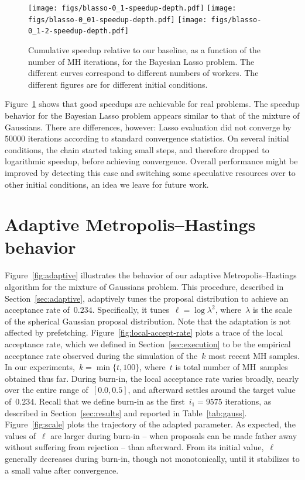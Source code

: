 \documentclass[angelino.tex]{subfiles}
\begin{document}
\begin{figure}[t!]
\centering
\vspace{-0.3in}
\texttt{[image: figs/blasso-0\_1-speedup-depth.pdf]}
\texttt{[image: figs/blasso-0\_01-speedup-depth.pdf]}
\texttt{[image: figs/blasso-0\_1-2-speedup-depth.pdf]}
\caption{Cumulative speedup relative to our baseline,
as a function of the number of MH iterations, for the Bayesian Lasso problem.
The different curves correspond to different numbers of workers.
The different figures are for different initial conditions.}
\label{fig:lasso}
\end{figure}

Figure~\ref{fig:lasso} shows that good speedups are achievable for real problems.
%
The speedup behavior for the Bayesian Lasso problem appears similar to that of the mixture of Gaussians.
%
There are differences, however: Lasso evaluation did not converge by 50000 iterations according to standard convergence statistics. On several initial conditions, the chain started taking small steps, and therefore dropped to logarithmic speedup, before achieving convergence.
%
Overall performance might be improved by detecting this case and switching some speculative resources over to other initial conditions, an idea we leave for future work.

\newpage

\section{Adaptive Metropolis--Hastings behavior}

Figure~\ref{fig:adaptive} illustrates the behavior of our adaptive
Metropolis--Hastings algorithm for the mixture of Gaussians problem.
This procedure, described in Section~\ref{sec:adaptive}, adaptively tunes
the proposal distribution to achieve an acceptance rate of~$0.234$.
Specifically, it tunes~${\ell = \log \lambda^2}$, where~$\lambda$ is the scale
of the spherical Gaussian proposal distribution.
Note that the adaptation is not affected by prefetching.
%
Figure~\ref{fig:local-accept-rate} plots a trace of the local acceptance rate,
which we defined in Section~\ref{sec:execution} to be the empirical acceptance
rate observed during the simulation of the~$k$ most recent MH samples.
In our experiments,~${k = \min\{t, 100\}}$, where~$t$ is total number of
MH~samples obtained thus far.
During burn-in, the local acceptance rate varies broadly,
nearly over the entire range of~${[0.0, 0.5]}$,
and afterward settles around the target value of~$0.234$.
Recall that we define burn-in as the first~${i_1 = 9575}$ iterations,
as described in Section~\ref{sec:results} and reported in Table~\ref{tab:gauss}.
%
Figure~\ref{fig:scale} plots the trajectory of the adapted parameter.
As expected, the values of~$\ell$ are larger during burn-in --
when proposals can be made father away without suffering from rejection --
than afterward.
From its initial value,~$\ell$ generally decreases during burn-in, though not
monotonically, until it stabilizes to a small value after convergence.
\end{document}
